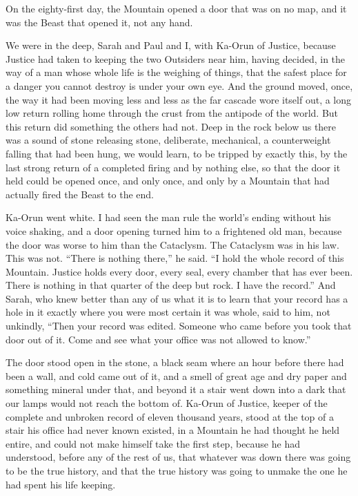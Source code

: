 \ornament

On the eighty-first day, the Mountain opened a door that was on no map, and it was the Beast that opened it, not any hand.\par

We were in the deep, Sarah and Paul and I, with Ka-Orun of Justice, because Justice had taken to keeping the two Outsiders near him, having decided, in the way of a man whose whole life is the weighing of things, that the safest place for a danger you cannot destroy is under your own eye. And the ground moved, once, the way it had been moving less and less as the far cascade wore itself out, a long low return rolling home through the crust from the antipode of the world. But this return did something the others had not. Deep in the rock below us there was a sound of stone releasing stone, deliberate, mechanical, a counterweight falling that had been hung, we would learn, to be tripped by exactly this, by the last strong return of a completed firing and by nothing else, so that the door it held could be opened once, and only once, and only by a Mountain that had actually fired the Beast to the end.\par

Ka-Orun went white. I had seen the man rule the world's ending without his voice shaking, and a door opening turned him to a frightened old man, because the door was worse to him than the Cataclysm. The Cataclysm was in his law. This was not. ``There is nothing there,'' he said. ``I hold the whole record of this Mountain. Justice holds every door, every seal, every chamber that has ever been. There is nothing in that quarter of the deep but rock. I have the record.'' And Sarah, who knew better than any of us what it is to learn that your record has a hole in it exactly where you were most certain it was whole, said to him, not unkindly, ``Then your record was edited. Someone who came before you took that door out of it. Come and see what your office was not allowed to know.''\par

The door stood open in the stone, a black seam where an hour before there had been a wall, and cold came out of it, and a smell of great age and dry paper and something mineral under that, and beyond it a stair went down into a dark that our lamps would not reach the bottom of. Ka-Orun of Justice, keeper of the complete and unbroken record of eleven thousand years, stood at the top of a stair his office had never known existed, in a Mountain he had thought he held entire, and could not make himself take the first step, because he had understood, before any of the rest of us, that whatever was down there was going to be the true history, and that the true history was going to unmake the one he had spent his life keeping.\par

